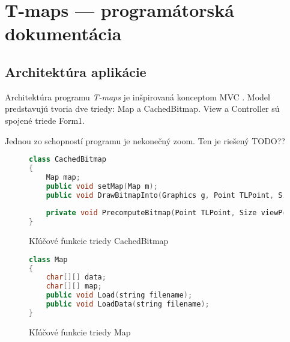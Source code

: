 \chapter{T-maps --- programátorská dokumentácia}
\label{programdoc}

\section{Architektúra aplikácie}
Architektúra programu \emph{T-maps} je inšpirovaná konceptom MVC \cite{krasner_mvc_1988}.
Model predstavujú tvoria dve triedy: Map a CachedBitmap.
View a Controller sú spojené triede Form1.


Jednou zo schopností programu je nekonečný zoom. Ten je riešený TODO?? 
\begin{figure}[h]
\begin{lstlisting}[language=C++]
class CachedBitmap
{
    Map map;
    public void setMap(Map m);
    public void DrawBitmapInto(Graphics g, Point TLPoint, Size ViewPortSize, int squareS, bool isBichrom, bool forcePrecomputing = false);
 
    private void PrecomputeBitmap(Point TLPoint, Size viewPortSize);
}
\end{lstlisting}
\caption{Kľúčové funkcie triedy CachedBitmap}
\label{fig:cachedbitmap_interface_plus}
\end{figure}


\begin{figure}[h]
\begin{lstlisting}[language=C++]
class Map
{
    char[][] data;
    char[][] map;
    public void Load(string filename);
    public void LoadData(string filename);
}
\end{lstlisting}
\caption{Kľúčové funkcie triedy Map}
\label{fig:map_interface}
\end{figure}